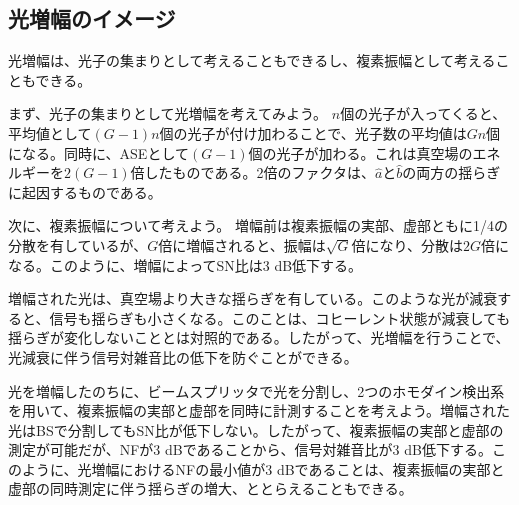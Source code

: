 \subsection{光増幅のイメージ}
光増幅は、光子の集まりとして考えることもできるし、複素振幅として考えることもできる。

まず、光子の集まりとして光増幅を考えてみよう。
$n$個の光子が入ってくると、平均値として$(G - 1)n$個の光子が付け加わることで、光子数の平均値は$Gn$個になる。同時に、ASEとして$(G - 1)$個の光子が加わる。これは真空場のエネルギーを$2(G-1)$倍したものである。2倍のファクタは、$\hat a$と$\hat b$の両方の揺らぎに起因するものである。

次に、複素振幅について考えよう。
増幅前は複素振幅の実部、虚部ともに1/4の分散を有しているが、$G$倍に増幅されると、振幅は$\sqrt G$倍になり、分散は$2G$倍になる。このように、増幅によってSN比は3 dB低下する。

増幅された光は、真空場より大きな揺らぎを有している。このような光が減衰すると、信号も揺らぎも小さくなる。このことは、コヒーレント状態が減衰しても揺らぎが変化しないこととは対照的である。したがって、光増幅を行うことで、光減衰に伴う信号対雑音比の低下を防ぐことができる。

光を増幅したのちに、ビームスプリッタで光を分割し、2つのホモダイン検出系を用いて、複素振幅の実部と虚部を同時に計測することを考えよう。増幅された光はBSで分割してもSN比が低下しない。したがって、複素振幅の実部と虚部の測定が可能だが、NFが3 dBであることから、信号対雑音比が3 dB低下する。このように、光増幅におけるNFの最小値が3 dBであることは、複素振幅の実部と虚部の同時測定に伴う揺らぎの増大、ととらえることもできる。







